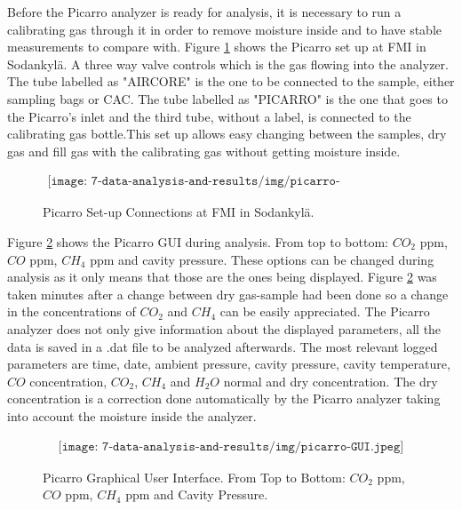 Before the Picarro analyzer is ready for analysis, it is necessary to run a calibrating gas through it in order to remove moisture inside and to have stable measurements to compare with. Figure \ref{fig:picarro-connections} shows the Picarro set up at FMI in Sodankyl\"{a}. A three way valve controls which is the gas flowing into the analyzer. The tube labelled as "AIRCORE" is the one to be connected to the sample, either sampling bags or CAC. The tube labelled as "PICARRO" is the one that goes to the Picarro's inlet and the third tube, without a label, is connected to the calibrating gas bottle.This set up allows easy changing between the samples, dry gas and fill gas with the calibrating gas without getting moisture inside.

\begin{figure}[H]
    \begin{align*}
        \texttt{[image: 7-data-analysis-and-results/img/picarro-connections.jpeg]}
    \end{align*}
    \caption{Picarro Set-up Connections at FMI in Sodankyl\"{a}. \label{fig:picarro-connections}}
\end{figure}

Figure \ref{fig:picarro-GUI} shows the Picarro GUI during analysis. From top to bottom: $CO_2$ ppm, $CO$ ppm, $CH_4$ ppm and cavity pressure. These options can be changed during analysis as it only means that those are the ones being displayed. Figure \ref{fig:picarro-GUI} was taken minutes after a change between dry gas-sample had been done so a change in the concentrations of $CO_2$ and $CH_4$ can be easily appreciated. 
The Picarro analyzer does not only give information about the displayed parameters, all the data is saved in a .dat file to be analyzed afterwards. The most relevant logged parameters are time, date, ambient pressure, cavity pressure, cavity temperature, $CO$ concentration, $CO_2$, $CH_4$ and $H_2O$ normal and dry concentration. The dry concentration is a correction done automatically by the Picarro analyzer taking into account the moisture inside the analyzer. 

\begin{figure}[H]
    \begin{align*}
        \texttt{[image: 7-data-analysis-and-results/img/picarro-GUI.jpeg]}
    \end{align*}
    \caption{Picarro Graphical User Interface. From Top to Bottom: $CO_2$ ppm, $CO$ ppm, $CH_4$ ppm and Cavity Pressure. \label{fig:picarro-GUI}}
\end{figure}


